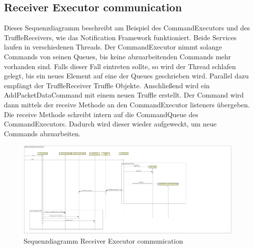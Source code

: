 \subsection{Receiver Executor communication}

Dieses Sequenzdiagramm beschreibt am Beispiel des CommandExecutors und des TruffleReceivers, wie das Notification Framework funktioniert.
Beide Services laufen in verschiedenen Threads. Der CommandExecutor nimmt solange Commands von seinen Queues, bis keine abzuarbeitenden
Commands mehr vorhanden sind. Falls dieser Fall eintreten sollte, so wird der Thread schlafen gelegt, bis ein neues Element auf eine
der Queues geschrieben wird. Parallel dazu empfängt der TruffleReceiver Truffle Objekte. Anschließend
wird ein AddPacketDataCommand mit einem neuen Truffle erstellt. Der Command wird dann mittels der receive Methode an den CommandExecutor listeners übergeben. Die receive Methode schreibt intern auf die CommandQueue des CommandExecutors. Dadurch wird dieser wieder aufgeweckt,
um neue Commands abzuarbeiten.

\FloatBarrier
\begin{figure}
  \centering
  \includegraphics[width=\textwidth]{../diagramimages/sd_receiver_executor_com.pdf}
  \caption[Sequenzdiagramm Receiver Executor communication]{Sequenzdiagramm Receiver Executor communication}
\end{figure} \FloatBarrier 